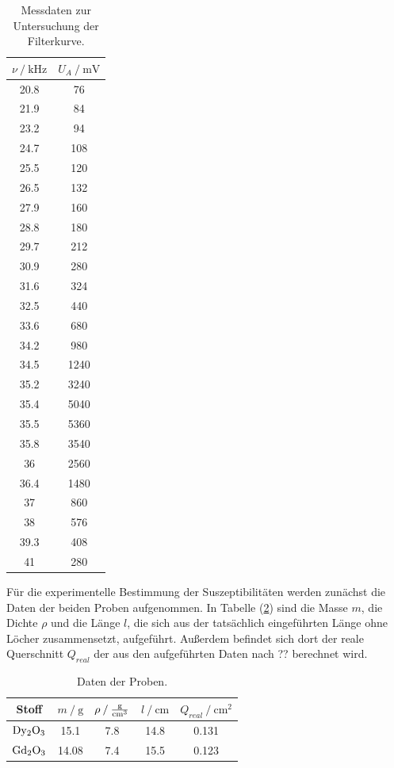 \begin{table}
\centering
\begin{tabular}{c c}
\toprule
{$\nu \mathbin{/} \si{\kilo\hertz} $} & {$U_A \mathbin{/} \si{\milli\volt}$}  \\
\midrule
20.8  &    76 \\
21.9  &    84 \\
23.2  &    94 \\
24.7  &   108 \\
25.5  &   120 \\
26.5  &   132 \\
27.9  &   160 \\
28.8  &   180 \\
29.7  &   212 \\
30.9  &   280 \\
31.6  &   324 \\
32.5  &   440 \\
33.6  &   680 \\
34.2  &   980 \\
34.5  &  1240 \\
35.2  &  3240 \\
35.4  &  5040 \\
35.5  &  5360 \\
35.8  &  3540 \\
36    &  2560 \\
36.4  &  1480 \\
37    &   860 \\
38    &   576 \\
39.3  &   408 \\
41    &   280 \\
\bottomrule
\end{tabular}
\caption{Messdaten zur Untersuchung der Filterkurve.}
\label{tab:selektiv}
\end{table}

\newpage
\noindent
Für die experimentelle Bestimmung der Suszeptibilitäten werden zunächst die Daten der beiden Proben aufgenommen.
In Tabelle (\ref{tab:proben}) sind die Masse $m$, die Dichte $\rho$ und die Länge $l$, 
die sich aus der tatsächlich eingeführten Länge ohne Löcher zusammensetzt, aufgeführt.
Außerdem befindet sich dort der reale Querschnitt $Q_{real}$ %
der aus den aufgeführten Daten nach ?? berechnet wird.

\begin{table}
    \centering
    \begin{tabular}{c c c c c}
        \toprule
        {Stoff} & {$m \mathbin{/} \si{\gram}$} & {$\rho \mathbin{/} \si[per-mode=fraction]{\gram\per\cubic\centi\meter}$} & {$l \mathbin{/} \si{\centi\meter}$} & {$Q_{real} \mathbin{/} \si{\centi\meter\squared}$} \\
    \midrule
    $\ce{Dy2O3}$ & 15.1  & 7.8 & 14.8 & 0.131 \\
    $\ce{Gd2O3}$ & 14.08 & 7.4 & 15.5 & 0.123 \\
    \bottomrule
\end{tabular}
\caption{Daten der Proben.}
\label{tab:proben}
\end{table}

